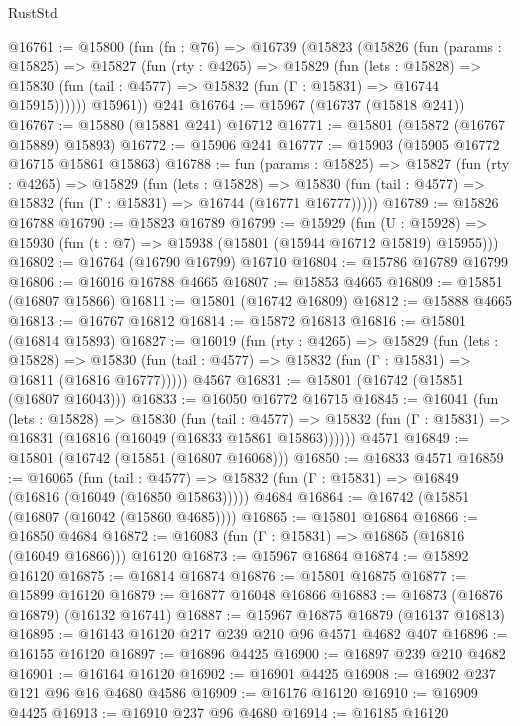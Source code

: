 \begin{lexlean}{RustStd}
\begin{coremodule}
@16761 := @15800
    (fun (fn : @76) =>
    @16739
      (@15823
        (@15826
          (fun (params : @15825) =>
          @15827
            (fun (rty : @4265) =>
            @15829
              (fun (lets : @15828) =>
              @15830 (fun (tail : @4577) => @15832 (fun (Γ : @15831) => @16744 @15915))))))
        @15961))
    @241
@16764 := @15967 (@16737 (@15818 @241))
@16767 := @15880 (@15881 @241) @16712
@16771 := @15801 (@15872 (@16767 @15889) @15893)
@16772 := @15906 @241
@16777 := @15903 (@15905 @16772 @16715 @15861 @15863)
@16788 := fun (params : @15825) =>
  @15827
    (fun (rty : @4265) =>
    @15829
      (fun (lets : @15828) =>
      @15830 (fun (tail : @4577) => @15832 (fun (Γ : @15831) => @16744 (@16771 @16777)))))
@16789 := @15826 @16788
@16790 := @15823 @16789
@16799 := @15929
    (fun (U : @15928) => @15930 (fun (t : @7) => @15938 (@15801 (@15944 @16712 @15819) @15955)))
@16802 := @16764 (@16790 @16799) @16710
@16804 := @15786 @16789 @16799
@16806 := @16016 @16788 @4665
@16807 := @15853 @4665
@16809 := @15851 (@16807 @15866)
@16811 := @15801 (@16742 @16809)
@16812 := @15888 @4665
@16813 := @16767 @16812
@16814 := @15872 @16813
@16816 := @15801 (@16814 @15893)
@16827 := @16019
    (fun (rty : @4265) =>
    @15829
      (fun (lets : @15828) =>
      @15830 (fun (tail : @4577) => @15832 (fun (Γ : @15831) => @16811 (@16816 @16777)))))
    @4567
@16831 := @15801 (@16742 (@15851 (@16807 @16043)))
@16833 := @16050 @16772 @16715
@16845 := @16041
    (fun (lets : @15828) =>
    @15830
      (fun (tail : @4577) =>
      @15832 (fun (Γ : @15831) => @16831 (@16816 (@16049 (@16833 @15861 @15863))))))
    @4571
@16849 := @15801 (@16742 (@15851 (@16807 @16068)))
@16850 := @16833 @4571
@16859 := @16065
    (fun (tail : @4577) => @15832 (fun (Γ : @15831) => @16849 (@16816 (@16049 (@16850 @15863)))))
    @4684
@16864 := @16742 (@15851 (@16807 (@16042 (@15860 @4685))))
@16865 := @15801 @16864
@16866 := @16850 @4684
@16872 := @16083 (fun (Γ : @15831) => @16865 (@16816 (@16049 @16866))) @16120
@16873 := @15967 @16864
@16874 := @15892 @16120
@16875 := @16814 @16874
@16876 := @15801 @16875
@16877 := @15899 @16120
@16879 := @16877 @16048 @16866
@16883 := @16873 (@16876 @16879) (@16132 @16741)
@16887 := @15967 @16875 @16879 (@16137 @16813)
@16895 := @16143 @16120 @217 @239 @210 @96 @4571 @4682 @407
@16896 := @16155 @16120
@16897 := @16896 @4425
@16900 := @16897 @239 @210 @4682
@16901 := @16164 @16120
@16902 := @16901 @4425
@16908 := @16902 @237 @121 @96 @16 @4680 @4586
@16909 := @16176 @16120
@16910 := @16909 @4425
@16913 := @16910 @237 @96 @4680
@16914 := @16185 @16120

\end{coremodule}
\end{lexlean}
